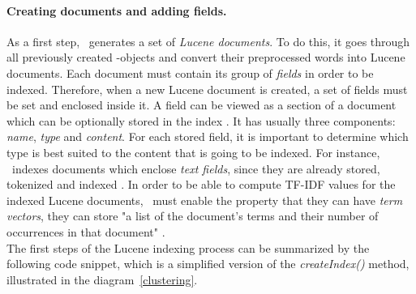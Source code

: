 \paragraph{Creating documents and adding fields.}
As a first step, \toolname\ generates a set of \textit{Lucene documents}. 
To do this, it goes through all previously created \Crash-objects and convert their preprocessed words into Lucene documents. Each document must contain its group of \textit{fields} in order to be indexed.
Therefore, when a new Lucene document is created, a set of fields must be set and enclosed inside it. 
A field can be viewed as a section of a document which can be optionally stored in the index \cite{lucenefield}. 
It has usually three components: \textit{name}, \textit{type} and \textit{content}. For each stored field, it is important to determine which type is best suited to the content that is going to be indexed. 
For instance, \toolname\ indexes documents which enclose \textit{text fields}, since they are already stored, tokenized and indexed \cite{lucenetextfield}. 
In order to be able to compute TF-IDF values for the indexed Lucene documents, \toolname\ must enable the property that they can have \textit{term vectors}, \ie they can store "a list of the document's terms and their number of occurrences in that document" \cite{lucenetermvector}. \\
The first steps of the Lucene indexing process can be summarized by the following code snippet, which is a simplified version of the \textit{createIndex()} method, illustrated in the diagram~\ref{clustering}.

